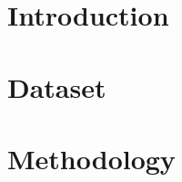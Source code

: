 \documentclass[10pt,sigconf]{acmart}
\begin{document}


\maketitle

\section{Introduction}



\section{Dataset}



\section{Methodology}
\end{document}
